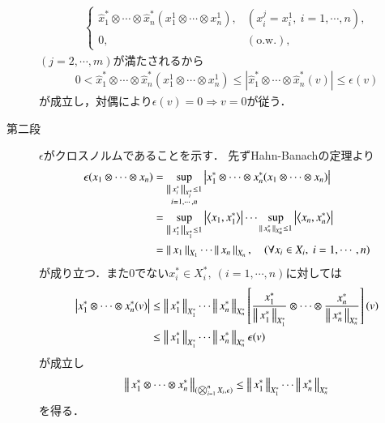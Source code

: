 \begin{prf}
\begin{description}
\begin{align}
					\begin{cases}
						\hat{x}_1^* \otimes \cdots \otimes \hat{x}_n^*(x^1_1 \otimes \cdots \otimes x^1_n), & (x^j_i = x^1_i,\ i=1,\cdots,n), \\
						0, & (\mbox{o.w.}),
					\end{cases}
				\end{align}
				$(j=2,\cdots,m)$が満たされるから
				\begin{align}
					0 < \hat{x}_1^* \otimes \cdots \otimes \hat{x}_n^*(x^1_1 \otimes \cdots \otimes x^1_n) 
					\leq \left| \hat{x}_1^* \otimes \cdots \otimes \hat{x}_n^* (v) \right|
					\leq \epsilon(v)
					\label{eq:thm_injective_norm_is_the_minimum_cross_norm_1}
				\end{align}
				が成立し，対偶により$\epsilon(v) = 0 \Rightarrow v = 0$が従う．
				
			\item[第二段]
				$\epsilon$がクロスノルムであることを示す．
				先ずHahn-Banachの定理より
				\begin{align}
					\epsilon(x_1 \otimes \cdots \otimes x_n) 
					&= \sup{\substack{\Norm{x_i^*}{X_i^*}\leq 1 \\ i=1,\cdots,n}}{\left| x_1^* \otimes \cdots \otimes x_n^* (x_1 \otimes \cdots \otimes x_n) \right|} \\
					&= \sup{\Norm{x_1^*}{X_1^*} \leq 1}{\left| \inprod<x_1,x_1^*> \right|}
					\cdots \sup{\Norm{x_n^*}{X_n^*} \leq 1}{\left| \inprod<x_n,x_n^*> \right|} \\
					&= \Norm{x_1}{X_1} \cdots \Norm{x_n}{X_n},
					\quad (\forall x_i \in X_i,\ i=1,\cdots,n)
				\end{align}
				が成り立つ．また0でない$x_i^* \in X_i^*,\ (i=1,\cdots,n)$に対しては
				\begin{align}
					\left| x_1^* \otimes \cdots \otimes x_n^* (v) \right|
					&\leq \left\|\, x_1^*\, \right\|_{X_1^*} \cdots \left\|\, x_n^*\, \right\|_{X_n^*} \left[ \frac{x_1^*}{\left\|\, x_1^*\, \right\|_{X_1^*}} \otimes \cdots \otimes \frac{x_n^*}{\left\|\, x_n^*\, \right\|_{X_n^*}} \right] (v) \\
					&\leq \left\|\, x_1^*\, \right\|_{X_1^*} \cdots \left\|\, x_n^*\, \right\|_{X_n^*} \epsilon(v)
				\end{align}
				が成立し
				\begin{align}
					\left\|\, x_1^* \otimes \cdots \otimes x_n^*\, \right\|_{(\bigotimes_{i=1}^n X_i,\epsilon)} \leq \left\|\, x_1^*\, \right\|_{X_1^*} \cdots \left\|\, x_n^*\, \right\|_{X_n^*}
				\end{align}
				を得る．
			

\end{description}
\end{prf}
